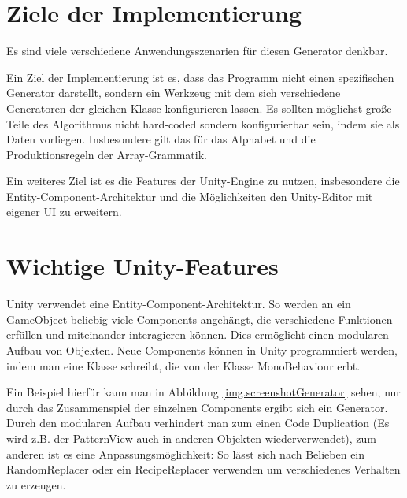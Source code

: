

\section{Ziele der Implementierung}

Es sind viele verschiedene Anwendungsszenarien für diesen Generator denkbar. 

Ein Ziel der Implementierung ist es, dass das Programm nicht einen spezifischen Generator darstellt, sondern ein Werkzeug mit dem sich verschiedene Generatoren der gleichen Klasse konfigurieren lassen. Es sollten möglichst große Teile des Algorithmus nicht hard-coded sondern konfigurierbar sein, indem sie als Daten vorliegen. Insbesondere gilt das für das Alphabet und die Produktionsregeln der Array-Grammatik.

Ein weiteres Ziel ist es die Features der Unity-Engine zu nutzen, insbesondere die Entity-Component-Architektur und die Möglichkeiten den Unity-Editor mit eigener UI zu erweitern. 

\section{Wichtige Unity-Features}

Unity verwendet eine Entity-Component-Architektur. So werden an ein GameObject beliebig viele Components angehängt, die verschiedene Funktionen erfüllen und miteinander interagieren können. Dies ermöglicht einen modularen Aufbau von Objekten. 
\cite[Seite: GameObjects]{unityManual}
Neue Components können in Unity programmiert werden, indem man eine Klasse schreibt, die von der Klasse MonoBehaviour erbt.
\cite[Seite: CreatingAndUsingScripts]{unityManual}

Ein Beispiel hierfür kann man in Abbildung \ref{img.screenshotGenerator} sehen, nur durch das Zusammenspiel der einzelnen Components ergibt sich ein Generator. Durch den modularen Aufbau verhindert man zum einen Code Duplication (Es wird z.B. der PatternView auch in anderen Objekten wiederverwendet), zum anderen ist es eine Anpassungsmöglichkeit: So lässt sich nach Belieben ein RandomReplacer oder ein RecipeReplacer verwenden um verschiedenes Verhalten zu erzeugen. 

